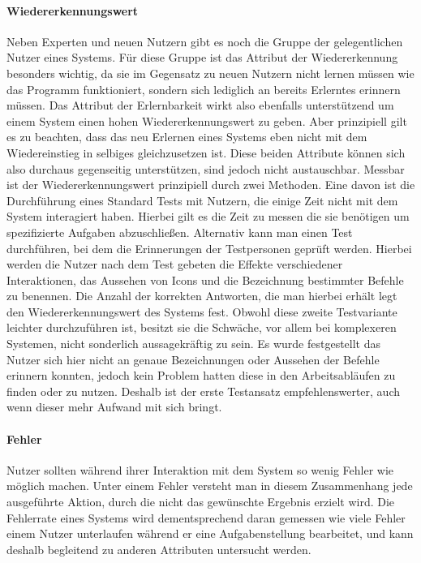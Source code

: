 \paragraph{Wiedererkennungswert}
Neben Experten und neuen Nutzern gibt es noch die Gruppe der gelegentlichen Nutzer eines Systems.
Für diese Gruppe ist das Attribut der Wiedererkennung besonders wichtig, da sie im Gegensatz zu neuen Nutzern nicht lernen müssen wie das Programm funktioniert, sondern sich lediglich an bereits Erlerntes erinnern müssen.
Das Attribut der Erlernbarkeit wirkt also ebenfalls unterstützend um einem System einen hohen Wiedererkennungswert zu geben.
Aber prinzipiell gilt es zu beachten, dass das neu Erlernen eines Systems eben nicht mit dem Wiedereinstieg in selbiges gleichzusetzen ist.
Diese beiden Attribute können sich also durchaus gegenseitig unterstützen, sind jedoch nicht austauschbar.
Messbar ist der Wiedererkennungswert prinzipiell durch zwei Methoden.
Eine davon ist die Durchführung eines Standard Tests mit Nutzern, die einige Zeit nicht mit dem System interagiert haben.
Hierbei gilt es die Zeit zu messen die sie benötigen um spezifizierte Aufgaben abzuschließen.
Alternativ kann man einen Test durchführen, bei dem die Erinnerungen der Testpersonen geprüft werden.
Hierbei werden die Nutzer nach dem Test gebeten die Effekte verschiedener Interaktionen, das Aussehen von Icons und die Bezeichnung bestimmter Befehle zu benennen.
Die Anzahl der korrekten Antworten, die man hierbei erhält legt den Wiedererkennungswert des Systems fest.
Obwohl diese zweite Testvariante leichter durchzuführen ist, besitzt sie die Schwäche, vor allem bei komplexeren Systemen, nicht sonderlich aussagekräftig zu sein.
Es wurde festgestellt das Nutzer sich hier nicht an genaue Bezeichnungen oder Aussehen der Befehle erinnern konnten, jedoch kein Problem hatten diese in den Arbeitsabläufen zu finden oder zu nutzen.
Deshalb ist der erste Testansatz empfehlenswerter, auch wenn dieser mehr Aufwand mit sich bringt.

\paragraph{Fehler}
Nutzer sollten während ihrer Interaktion mit dem System so wenig Fehler wie möglich machen. 
Unter einem Fehler versteht man in diesem Zusammenhang jede ausgeführte Aktion, durch die nicht das gewünschte Ergebnis erzielt wird.
Die Fehlerrate eines Systems wird dementsprechend daran gemessen wie viele Fehler einem Nutzer unterlaufen während er eine Aufgabenstellung bearbeitet, und kann deshalb begleitend zu anderen Attributen untersucht werden.

